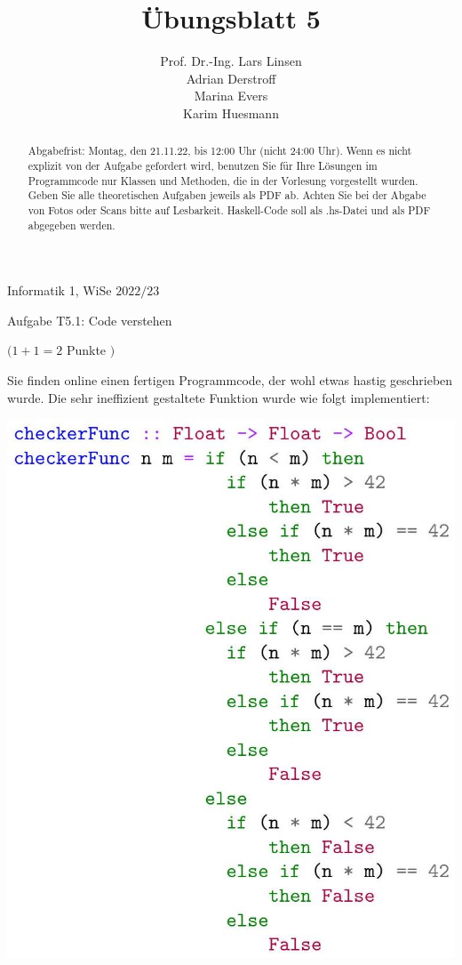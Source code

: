 \documentclass[10pt]{article}
\title{Übungsblatt 5 }
\author{Prof. Dr.-Ing. Lars Linsen\\
Adrian Derstroff\\
Marina Evers\\
Karim Huesmann}
\date{}
\begin{document}
\maketitle
Informatik 1, WiSe $2022 / 23$



\begin{abstract}
Abgabefrist: Montag, den 21.11.22, bis 12:00 Uhr (nicht 24:00 Uhr). Wenn es nicht explizit von der Aufgabe gefordert wird, benutzen Sie für Ihre Lösungen im 
 Programmcode nur Klassen und Methoden, die in der Vorlesung vorgestellt wurden. Geben Sie alle theoretischen Aufgaben jeweils als PDF ab. Achten Sie bei der Abgabe von Fotos oder Scans bitte auf Lesbarkeit. Haskell-Code soll als .hs-Datei und als PDF abgegeben werden.
\end{abstract}

Aufgabe T5.1: Code verstehen

$(1+1=2$ Punkte $)$

Sie finden online einen fertigen Programmcode, der wohl etwas hastig geschrieben wurde. Die sehr ineffizient gestaltete Funktion wurde wie folgt implementiert:

\includegraphics[max width=\textwidth]{2022_11_15_0a5a2eee0aef383b0ce9g-1}
\end{document}
